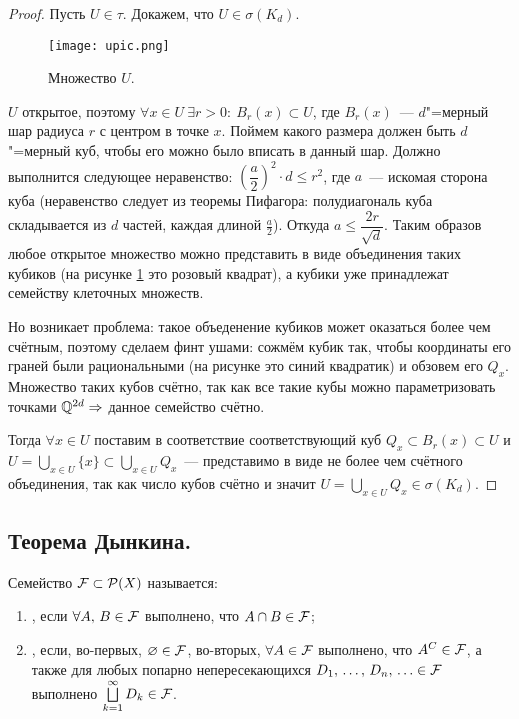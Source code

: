\begin{claim}
\begin{proof}
        Пусть $U\in\tau$. Докажем, что $U\in\sigma(K_d)$.

        \begin{figure}[!ht]
            \centering
            \texttt{[image: upic.png]}
            \caption{Множество $U$.}
            \label{fig:upic}
        \end{figure}

        $U$ открытое, поэтому $\forall x\in U\ \exists r>0:\ B_r(x)\subset U$, где $B_r(x)$~--- 
        $d$"=мерный шар радиуса $r$ с центром в точке $x$. Поймем какого размера должен быть 
        $d$"=мерный куб, чтобы его можно было вписать в данный шар. Должно выполнится следующее 
        неравенство: $\left(\dfrac{a}{2}\right)^2\cdot d\leqslant r^2$, где $a$~--- искомая сторона
        куба (неравенство следует из теоремы Пифагора: полудиагональ куба складывается из $d$ частей, 
        каждая длиной $\frac{a}{2}$). Откуда $a\leqslant \dfrac{2r}{\sqrt{d}}$. Таким образов любое 
        открытое множество можно представить в виде объединения таких кубиков (на рисунке \ref{fig:upic} это розовый квадрат),
        а кубики уже принадлежат семейству клеточных множеств.
        
        Но возникает проблема: такое объеденение кубиков может оказаться более чем счётным, поэтому сделаем финт ушами:
        сожмём кубик так, чтобы координаты его граней были рациональными (на рисунке это синий квадратик) и обзовем его $Q_x$.
        Множество таких кубов счётно, так как все такие кубы можно параметризовать точками $\mathbb{Q}^{2d}\Rightarrow$ данное семейство 
        счётно. 

        Тогда $\forall x\in U$ поставим в соответствие соответствующий куб $Q_x\subset B_r(x)\subset U$ и 
        $U=\bigcup\limits_{x\in U}\{x\}\subset \bigcup\limits_{x\in U}Q_x$~--- представимо в виде 
        не более чем счётного объединения, так как число кубов счётно и значит $U=\bigcup\limits_{x\in U}Q_x\in\sigma(K_d)$.

    \end{proof} 
\end{claim}

\subsection{Теорема Дынкина.}

\begin{definition}
    Семейство $\mathcal{F} \subset \mathcal{P}(X)$ называется:
    \begin{enumerate}[label=\arabic*)]
        \item {}, если $\forall A,\, B\in\mathcal{F} $ выполнено, что $A\cap B\in\mathcal{F} $;
        \item {}, если, во-первых, $\varnothing\in\mathcal{F} $, во-вторых,
        $\forall A\in\mathcal{F} $ выполнено, что $A^C\in\mathcal{F} $, а также для любых попарно непересекающихся 
        $D_1,\, \ldots,\, D_n,\,\ldots\in\mathcal{F} $ выполнено $\bigsqcup\limits_{k=1}^{\infty} D_k\in\mathcal{F} $.
    \end{enumerate}
\end{definition}

